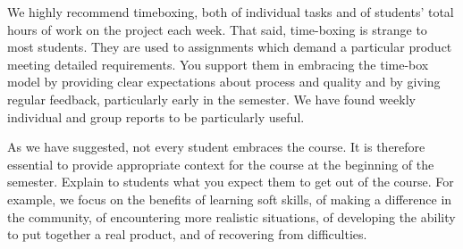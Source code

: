 We highly recommend timeboxing, both of individual tasks and of students' 
total hours of work on the project each week.
That said, 
time-boxing is strange to most students.  They are used to assignments 
which demand a particular
product meeting detailed requirements.  You support them in embracing the
time-box model by providing clear expectations about process and quality and
by giving regular feedback, particularly early in the semester.  We have
found weekly individual and group reports to be particularly useful.

As we have suggested, not every student embraces the course.  It
is therefore essential to provide appropriate context for the course at
the beginning of the semester.  Explain to students what you expect them
to get out of the course.  For example, we focus on the benefits of learning
soft skills, of making a difference in the community, of encountering
more realistic situations, of developing the ability to put together a
real product, and of recovering from difficulties.

